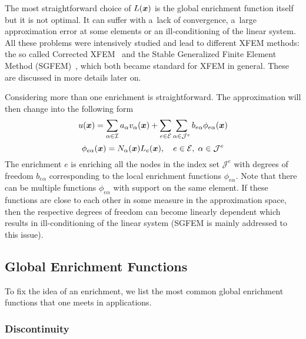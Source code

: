 
The most straightforward choice of $L(\mathbf{\boldsymbol{x}})$ is the global enrichment function itself but it is not optimal. It can suffer with a~lack of convergence, a~large approximation error at some elements or an ill-conditioning of the linear system.
All these problems were intensively studied and lead to different XFEM methods:
the so called Corrected XFEM~\cite{fries_corrected_2008}
and the Stable Generalized Finite Element Method (SGFEM)~\cite{babuska_stable_2012, gupta_stable_2013}, which 
both became standard for XFEM in general. These are discussed in more details later on.

Considering more than one enrichment is straightforward. The approximation will then change into the following form
\begin{equation} \label{eqn:soa_xfem_standard_form_mult1}
    u(\mathbf{\boldsymbol{x}}) = \sum_{\alpha\in\mathcal{I}}a_\alpha v_\alpha(\mathbf{\boldsymbol{x}})
        + \sum_{e\in\mathcal{E}}\sum_{\alpha\in\mathcal{J}^e} b_{e\alpha} \phi_{e\alpha}(\mathbf{\boldsymbol{x}})
\end{equation}
\begin{equation} \label{eqn:soa_xfem_standard_form_mult2}
    \phi_{e\alpha}(\mathbf{\boldsymbol{x}}) = N_\alpha(\mathbf{\boldsymbol{x}})L_e(\mathbf{\boldsymbol{x}}), \quad e\in\mathcal{E},\; \alpha\in\mathcal{J}^e
\end{equation}
The enrichment $e$ is enriching all the nodes in the index set $\mathcal{J}^e$ with degrees of freedom $b_{e\alpha}$
corresponding to the local enrichment functions $\phi_{e\alpha}$. Note that there can be multiple functions $\phi_{e\alpha}$ with support on the same element. If these functions are close to each other in some measure in the approximation space, then the respective degrees of freedom can become linearly dependent which results in ill-conditioning of the linear system (SGFEM is mainly addressed to this issue).

\subsection{Global Enrichment Functions} \label{sec:global_enrichment}
To fix the idea of an enrichment, we list the most common global enrichment functions that one meets in applications.

\subsubsection{Discontinuity} \label{sec:glob_enr_discontinuity}

